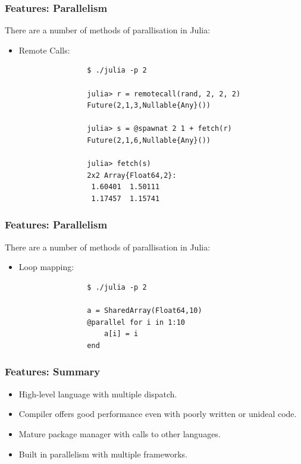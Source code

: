 \documentclass{beamer}
\begin{document}
\begin{frame}[fragile]
	\frametitle{Features: Parallelism}

	There are a number of methods of parallisation in Julia: \newline

	\begin{itemize}
		\item Remote Calls:

			\begin{verbatim}
				$ ./julia -p 2

				julia> r = remotecall(rand, 2, 2, 2)
				Future(2,1,3,Nullable{Any}())

				julia> s = @spawnat 2 1 + fetch(r)
				Future(2,1,6,Nullable{Any}())

				julia> fetch(s)
				2x2 Array{Float64,2}:
				 1.60401  1.50111
				 1.17457  1.15741
			\end{verbatim}
	\end{itemize}
\end{frame}

\begin{frame}[fragile]
	\frametitle{Features: Parallelism}

	There are a number of methods of parallisation in Julia: \newline

	\begin{itemize}
		\item Loop mapping:

			\begin{verbatim}
				$ ./julia -p 2

				a = SharedArray(Float64,10)
				@parallel for i in 1:10
				    a[i] = i
				end
			\end{verbatim}
	\end{itemize}
\end{frame}

\begin{frame}
	\frametitle{Features: Summary}
	\begin{itemize}
		\item High-level language with multiple dispatch. \newline

		\item Compiler offers good performance even with poorly written or unideal code. \newline

		\item Mature package manager with calls to other languages. \newline

		\item Built in parallelism with multiple frameworks.
	\end{itemize}
\end{frame}
\end{document}
